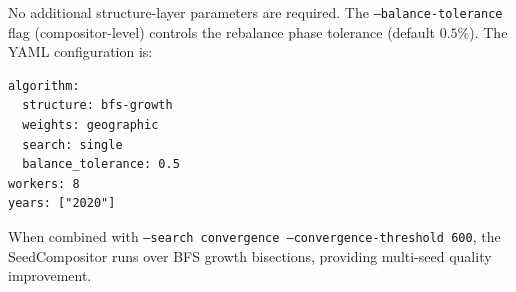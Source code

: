 No additional structure-layer parameters are required.
The \texttt{--balance-tolerance} flag (compositor-level) controls the
rebalance phase tolerance (default $0.5\%$).
The YAML configuration is:

\begin{verbatim}
algorithm:
  structure: bfs-growth
  weights: geographic
  search: single
  balance_tolerance: 0.5
workers: 8
years: ["2020"]
\end{verbatim}

When combined with \texttt{--search convergence --convergence-threshold 600},
the SeedCompositor runs \cs{} over BFS growth bisections, providing
multi-seed quality improvement.
